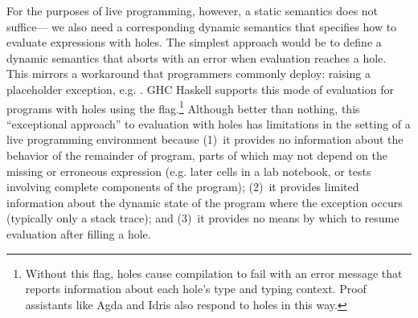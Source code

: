 %
For the purposes of live programming, however, a static semantics does not suffice---%
we also need a corresponding dynamic semantics that specifies how to evaluate expressions with holes.
%
%
The simplest approach would be to define a dynamic semantics that aborts with an error when evaluation reaches a hole. 
%
This mirrors a workaround that programmers commonly deploy: 
raising a placeholder exception, e.g. . 
GHC Haskell supports this mode of evaluation for programs with holes using the  flag.\footnote{
Without this flag, holes cause compilation to fail with an error message that reports information about each hole's type and typing context. 
Proof assistants like Agda \cite{norell:thesis,norell2009dependently} and Idris \cite{brady2013idris} also respond to holes in this way.
} 
Although better than nothing, this ``exceptional approach'' to evaluation with holes has limitations 
in the setting of a live programming environment because 
(1)~it provides no information about the behavior of the remainder of program, 
parts of which may not depend on the missing or erroneous expression (e.g. later cells in a lab notebook, or tests involving complete components of the program); 
(2)~it provides limited information about the dynamic state of the program where the exception occurs
(typically only a stack trace);  
and 
(3)~it provides no means by which to resume evaluation after filling a hole.


